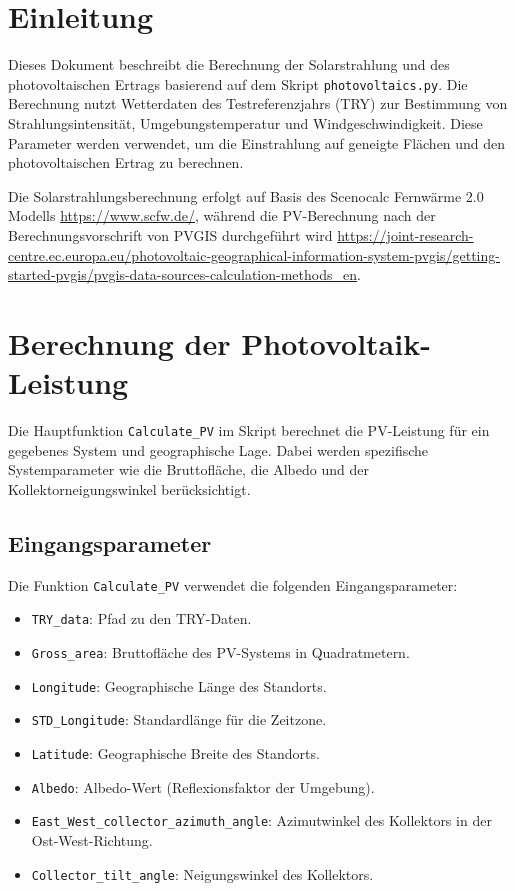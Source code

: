 \section{Einleitung}
Dieses Dokument beschreibt die Berechnung der Solarstrahlung und des photovoltaischen Ertrags basierend auf dem Skript \texttt{photovoltaics.py}. Die Berechnung nutzt Wetterdaten des Testreferenzjahrs (TRY) zur Bestimmung von Strahlungsintensität, Umgebungstemperatur und Windgeschwindigkeit. Diese Parameter werden verwendet, um die Einstrahlung auf geneigte Flächen und den photovoltaischen Ertrag zu berechnen.

Die Solarstrahlungsberechnung erfolgt auf Basis des Scenocalc Fernwärme 2.0 Modells \url{https://www.scfw.de/}, während die PV-Berechnung nach der Berechnungsvorschrift von PVGIS durchgeführt wird \url{https://joint-research-centre.ec.europa.eu/photovoltaic-geographical-information-system-pvgis/getting-started-pvgis/pvgis-data-sources-calculation-methods_en}.

\section{Berechnung der Photovoltaik-Leistung}
Die Hauptfunktion \texttt{Calculate\_PV} im Skript berechnet die PV-Leistung für ein gegebenes System und geographische Lage. Dabei werden spezifische Systemparameter wie die Bruttofläche, die Albedo und der Kollektorneigungswinkel berücksichtigt.

\subsection{Eingangsparameter}
Die Funktion \texttt{Calculate\_PV} verwendet die folgenden Eingangsparameter:
\begin{itemize}
    \item \texttt{TRY\_data}: Pfad zu den TRY-Daten.
    \item \texttt{Gross\_area}: Bruttofläche des PV-Systems in Quadratmetern.
    \item \texttt{Longitude}: Geographische Länge des Standorts.
    \item \texttt{STD\_Longitude}: Standardlänge für die Zeitzone.
    \item \texttt{Latitude}: Geographische Breite des Standorts.
    \item \texttt{Albedo}: Albedo-Wert (Reflexionsfaktor der Umgebung).
    \item \texttt{East\_West\_collector\_azimuth\_angle}: Azimutwinkel des Kollektors in der Ost-West-Richtung.
    \item \texttt{Collector\_tilt\_angle}: Neigungswinkel des Kollektors.
\end{itemize}

